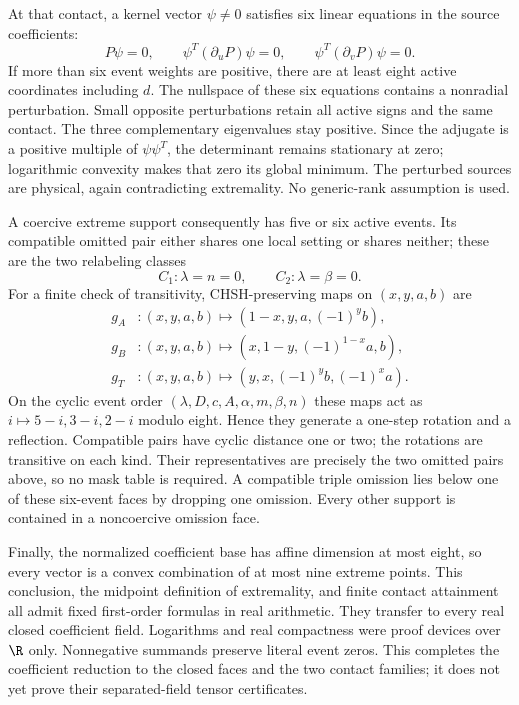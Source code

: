 At that contact, a kernel vector $\psi\ne0$ satisfies six linear equations in the source coefficients:
\[P\psi=0,\qquad\psi^T(\partial_uP)\psi=0,\qquad\psi^T(\partial_vP)\psi=0.\]
If more than six event weights are positive, there are at least eight active coordinates including $d$. The nullspace of these six equations contains a nonradial perturbation. Small opposite perturbations retain all active signs and the same contact. The three complementary eigenvalues stay positive. Since the adjugate is a positive multiple of $\psi\psi^T$, the determinant remains stationary at zero; logarithmic convexity makes that zero its global minimum. The perturbed sources are physical, again contradicting extremality. No generic-rank assumption is used.

A coercive extreme support consequently has five or six active events. Its compatible omitted pair either shares one local setting or shares neither; these are the two relabeling classes
\[C_1:\lambda=n=0,\qquad C_2:\lambda=\beta=0.\]
For a finite check of transitivity, CHSH-preserving maps on $(x,y,a,b)$ are
\begin{align*}
g_A&:(x,y,a,b)\mapsto(1-x,y,a,(-1)^yb),\\
g_B&:(x,y,a,b)\mapsto(x,1-y,(-1)^{1-x}a,b),\\
g_T&:(x,y,a,b)\mapsto(y,x,(-1)^yb,(-1)^xa).
\end{align*}
On the cyclic event order $(\lambda,D,c,A,\alpha,m,\beta,n)$ these maps act as $i\mapsto5-i,3-i,2-i$ modulo eight. Hence they generate a one-step rotation and a reflection. Compatible pairs have cyclic distance one or two; the rotations are transitive on each kind. Their representatives are precisely the two omitted pairs above, so no mask table is required.
A compatible triple omission lies below one of these six-event faces by dropping one omission. Every other support is contained in a noncoercive omission face.

Finally, the normalized coefficient base has affine dimension at most eight, so every vector is a convex combination of at most nine extreme points. This conclusion, the midpoint definition of extremality, and finite contact attainment all admit fixed first-order formulas in real arithmetic. They transfer to every real closed coefficient field. Logarithms and real compactness were proof devices over $\R$ only. Nonnegative summands preserve literal event zeros. This completes the coefficient reduction to the closed faces and the two contact families; it does not yet prove their separated-field tensor certificates.
